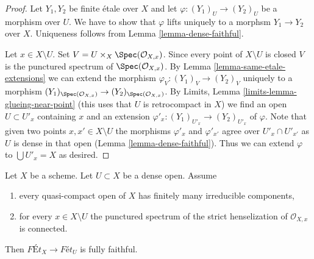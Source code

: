 \begin{proof}
Let $Y_1, Y_2$ be finite \'etale over $X$ and let
$\varphi : (Y_1)_U \to (Y_2)_U$ be a morphism over $U$. We have to show that
$\varphi$ lifts uniquely to a morphsm $Y_1 \to Y_2$ over $X$.
Uniqueness follows from Lemma \ref{lemma-dense-faithful}.

\medskip\noindent
Let $x \in X \setminus U$. Set $V = U \times_X \Spec(\mathcal{O}_{X, x})$.
Since every point of $X \setminus U$ is closed $V$ is the punctured spectrum
of $\Spec(\mathcal{O}_{X, x})$. By
Lemma \ref{lemma-same-etale-extensions}
we can extend the morphism $\varphi_V : (Y_1)_V \to (Y_2)_V$
uniquely to a morphism
$(Y_1)_{\Spec(\mathcal{O}_{X, x})} \to (Y_2)_{\Spec(\mathcal{O}_{X, x})}$.
By Limits, Lemma \ref{limits-lemma-glueing-near-point}
(this uses that $U$ is retrocompact in $X$)
we find an open $U \subset U'_x$ containing $x$ and an extension
$\varphi'_x : (Y_1)_{U'_x} \to (Y_2)_{U'_x}$ of $\varphi$.
Note that given two points $x, x' \in X \setminus U$ the
morphisms $\varphi'_x$ and $\varphi'_{x'}$ agree over
$U'_x \cap U'_{x'}$ as $U$ is dense in that open
(Lemma \ref{lemma-dense-faithful}). Thus we can extend $\varphi$
to $\bigcup U'_x = X$ as desired.
\end{proof}

\begin{lemma}
\label{lemma-quasi-compact-dense-open-connected-at-infinity}
Let $X$ be a scheme. Let $U \subset X$ be a dense open. Assume
\begin{enumerate}
\item every quasi-compact open of $X$ has finitely many
irreducible components,
\item for every $x \in X \setminus U$ the punctured spectrum of the
strict henselization of $\mathcal{O}_{X, x}$ is connected.
\end{enumerate}
Then $\textit{F\'Et}_X \to \textit{F\'et}_U$ is fully faithful.
\end{lemma}

